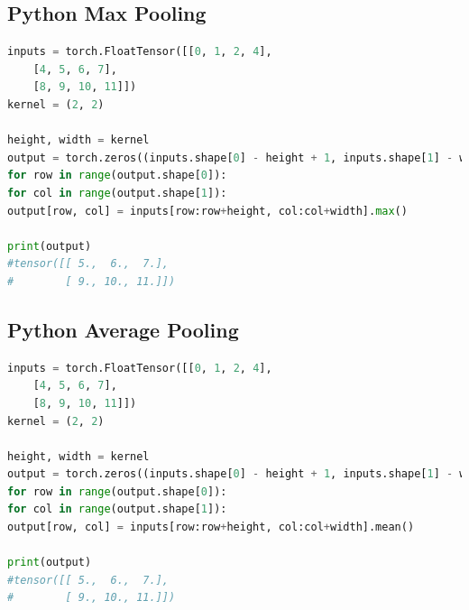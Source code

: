 \subsection{Python Max Pooling}
\begin{lstlisting}[language=Python]
inputs = torch.FloatTensor([[0, 1, 2, 4],
    [4, 5, 6, 7],
    [8, 9, 10, 11]])
kernel = (2, 2)

height, width = kernel
output = torch.zeros((inputs.shape[0] - height + 1, inputs.shape[1] - width + 1))
for row in range(output.shape[0]):
for col in range(output.shape[1]):
output[row, col] = inputs[row:row+height, col:col+width].max()

print(output)
#tensor([[ 5.,  6.,  7.],
#        [ 9., 10., 11.]])
\end{lstlisting}

\subsection{Python Average Pooling}
\begin{lstlisting}[language=Python]
inputs = torch.FloatTensor([[0, 1, 2, 4],
    [4, 5, 6, 7],
    [8, 9, 10, 11]])
kernel = (2, 2)

height, width = kernel
output = torch.zeros((inputs.shape[0] - height + 1, inputs.shape[1] - width + 1))
for row in range(output.shape[0]):
for col in range(output.shape[1]):
output[row, col] = inputs[row:row+height, col:col+width].mean()

print(output)
#tensor([[ 5.,  6.,  7.],
#        [ 9., 10., 11.]])
\end{lstlisting}

\newpage